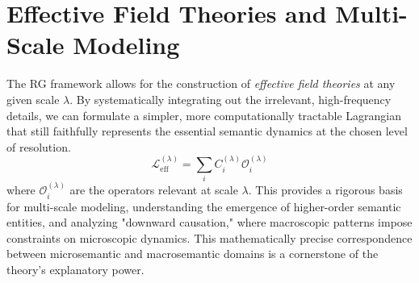 
\section{Effective Field Theories and Multi-Scale Modeling}

The RG framework allows for the construction of \textit{effective field theories} at any given scale \(\lambda\). By systematically integrating out the irrelevant, high-frequency details, we can formulate a simpler, more computationally tractable Lagrangian that still faithfully represents the essential semantic dynamics at the chosen level of resolution.
\begin{equation}
\mathcal{L}_{\mathrm{eff}}^{(\lambda)} = \sum_{i} C_{i}^{(\lambda)} \mathcal{O}_{i}^{(\lambda)}
\end{equation}
where \(\mathcal{O}_{i}^{(\lambda)}\) are the operators relevant at scale \(\lambda\). This provides a rigorous basis for multi-scale modeling, understanding the emergence of higher-order semantic entities, and analyzing "downward causation," where macroscopic patterns impose constraints on microscopic dynamics. This mathematically precise correspondence between microsemantic and macrosemantic domains is a cornerstone of the theory's explanatory power. 